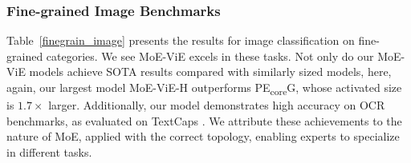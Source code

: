\documentclass[runningheads]{llncs}
\begin{document}
\subsubsection{Fine-grained Image Benchmarks}

Table~\ref{finegrain_image} presents the results for image classification on fine-grained categories. We see MoE-ViE excels in these tasks. Not only do our MoE-ViE models achieve SOTA results compared with similarly sized models, here, again, our largest model MoE-ViE-H outperforms PE\textsubscript{core}G, whose activated size is $1.7\times$ larger. Additionally, our model demonstrates high accuracy on OCR benchmarks, as evaluated on TextCaps \cite{textcap}. We attribute these achievements to the nature of MoE, applied with the correct topology, enabling experts to specialize in different tasks.
\end{document}
